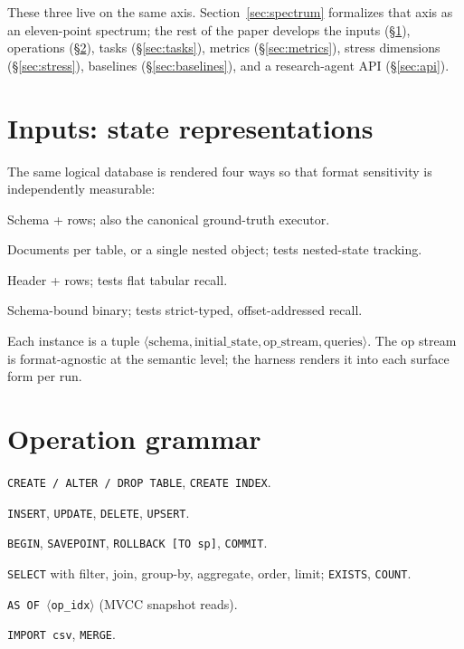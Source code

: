 \documentclass[11pt]{article}
\begin{document}
These three live on the same axis. Section~\ref{sec:spectrum} formalizes
that axis as an eleven-point spectrum; the rest of the paper develops the
inputs (\S\ref{sec:inputs}), operations (\S\ref{sec:ops}), tasks
(\S\ref{sec:tasks}), metrics (\S\ref{sec:metrics}), stress dimensions
(\S\ref{sec:stress}), baselines (\S\ref{sec:baselines}), and a
research-agent API (\S\ref{sec:api}).

\section{Inputs: state representations}
\label{sec:inputs}

The same logical database is rendered four ways so that format
sensitivity is independently measurable:

\begin{description}[leftmargin=*]
  \item[SQLite.] Schema + rows; also the canonical ground-truth executor.
  \item[JSON.] Documents per table, or a single nested object; tests
    nested-state tracking.
  \item[CSV.] Header + rows; tests flat tabular recall.
  \item[FlatBuffers.] Schema-bound binary; tests strict-typed,
    offset-addressed recall.
\end{description}

Each instance is a tuple
$\langle \text{schema}, \text{initial\_state}, \text{op\_stream},
\text{queries}\rangle$. The op stream is format-agnostic at the semantic
level; the harness renders it into each surface form per run.

\section{Operation grammar}
\label{sec:ops}

\begin{description}[leftmargin=*]
  \item[DDL.] \texttt{CREATE / ALTER / DROP TABLE}, \texttt{CREATE INDEX}.
  \item[DML.] \texttt{INSERT}, \texttt{UPDATE}, \texttt{DELETE},
    \texttt{UPSERT}.
  \item[Transaction.] \texttt{BEGIN}, \texttt{SAVEPOINT},
    \texttt{ROLLBACK [TO sp]}, \texttt{COMMIT}.
  \item[Query.] \texttt{SELECT} with filter, join, group-by, aggregate,
    order, limit; \texttt{EXISTS}, \texttt{COUNT}.
  \item[Time-travel.] \texttt{AS OF $\langle$op\_idx$\rangle$} (MVCC
    snapshot reads).
  \item[Bulk.] \texttt{IMPORT csv}, \texttt{MERGE}.
\end{description}
\end{document}
